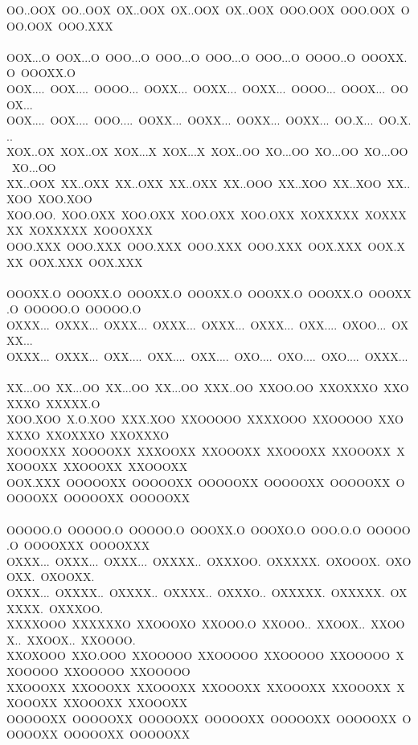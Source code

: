 \documentclass[12pt]{article}
\begin{document}
\begin{center}
{OO..OOX~OO..OOX~OX..OOX~OX..OOX~OX..OOX~OOO.OOX~OOO.OOX~OOO.OOX~OOO.XXX~\\
~\\
OOX...O~OOX...O~OOO...O~OOO...O~OOO...O~OOO...O~OOOO..O~OOOXX.O~OOOXX.O~\\
OOX....~OOX....~OOOO...~OOXX...~OOXX...~OOXX...~OOOO...~OOOX...~OOOX...~\\
OOX....~OOX....~OOO....~OOXX...~OOXX...~OOXX...~OOXX...~OO.X...~OO.X...~\\
XOX..OX~XOX..OX~XOX...X~XOX...X~XOX..OO~XO...OO~XO...OO~XO...OO~XO...OO~\\
XX..OOX~XX..OXX~XX..OXX~XX..OXX~XX..OOO~XX..XOO~XX..XOO~XX..XOO~XOO.XOO~\\
XOO.OO.~XOO.OXX~XOO.OXX~XOO.OXX~XOO.OXX~XOXXXXX~XOXXXXX~XOXXXXX~XOOOXXX~\\
OOO.XXX~OOO.XXX~OOO.XXX~OOO.XXX~OOO.XXX~OOX.XXX~OOX.XXX~OOX.XXX~OOX.XXX~\\
~\\\pagebreak
OOOXX.O~OOOXX.O~OOOXX.O~OOOXX.O~OOOXX.O~OOOXX.O~OOOXX.O~OOOOO.O~OOOOO.O~\\
OXXX...~OXXX...~OXXX...~OXXX...~OXXX...~OXXX...~OXX....~OXOO...~OXXX...~\\
OXXX...~OXXX...~OXX....~OXX....~OXX....~OXO....~OXO....~OXO....~OXXX...~\\
XX...OO~XX...OO~XX...OO~XX...OO~XXX..OO~XXOO.OO~XXOXXXO~XXOXXXO~XXXXX.O~\\
XOO.XOO~X.O.XOO~XXX.XOO~XXOOOOO~XXXXOOO~XXOOOOO~XXOXXXO~XXOXXXO~XXOXXXO~\\
XOOOXXX~XOOOOXX~XXXOOXX~XXOOOXX~XXOOOXX~XXOOOXX~XXOOOXX~XXOOOXX~XXOOOXX~\\
OOX.XXX~OOOOOXX~OOOOOXX~OOOOOXX~OOOOOXX~OOOOOXX~OOOOOXX~OOOOOXX~OOOOOXX~\\
~\\
OOOOO.O~OOOOO.O~OOOOO.O~OOOXX.O~OOOXO.O~OOO.O.O~OOOOO.O~OOOOXXX~OOOOXXX~\\
OXXX...~OXXX...~OXXX...~OXXXX..~OXXXOO.~OXXXXX.~OXOOOX.~OXOOXX.~OXOOXX.~\\
OXXX...~OXXXX..~OXXXX..~OXXXX..~OXXXO..~OXXXXX.~OXXXXX.~OXXXXX.~OXXXOO.~\\
XXXXOOO~XXXXXXO~XXOOOXO~XXOOO.O~XXOOO..~XXOOX..~XXOOX..~XXOOX..~XXOOOO.~\\
XXOXOOO~XXO.OOO~XXOOOOO~XXOOOOO~XXOOOOO~XXOOOOO~XXOOOOO~XXOOOOO~XXOOOOO~\\
XXOOOXX~XXOOOXX~XXOOOXX~XXOOOXX~XXOOOXX~XXOOOXX~XXOOOXX~XXOOOXX~XXOOOXX~\\
OOOOOXX~OOOOOXX~OOOOOXX~OOOOOXX~OOOOOXX~OOOOOXX~OOOOOXX~OOOOOXX~OOOOOXX~\\
}
\end{center}
\end{document}
